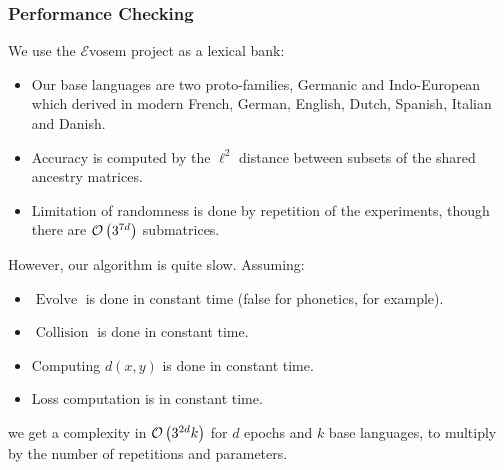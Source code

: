 \documentclass[ratio=169]{beamercours}
\DeclareMathOperator{\revo}{Evolve}
\DeclareMathOperator{\coll}{Collision}
\begin{document}
\begin{frame}[allowframebreaks]
	\frametitle{Performance Checking}
	We use the $\mathcal{E}$vosem project \cite{evosem} as a lexical bank:
	\begin{itemize}
		\item Our base languages are two proto-families, Germanic and Indo-European which
derived in modern French, German, English, Dutch, Spanish, Italian and Danish.
		\item Accuracy is computed by the $\ell^{2}$ distance between subsets of the shared ancestry matrices.
		\item Limitation of randomness is done by repetition of the experiments, though there are $\mathcal{O}\left( 3^{7d} \right)$ submatrices.
	\end{itemize}

	\framebreak

	However, our algorithm is quite slow. Assuming:
	\begin{itemize}
		\item $\revo$ is done in constant time (false for phonetics, for example).
		\item $\coll$ is done in constant time.
		\item Computing $d\left( x, y \right)$ is done in constant time.
		\item Loss computation is in constant time.
	\end{itemize}
	we get a complexity in $\mathcal{O}\left( 3^{2d}k \right)$ for $d$ epochs and $k$ base languages, to multiply by the number of repetitions and parameters.
\end{frame}
\end{document}
